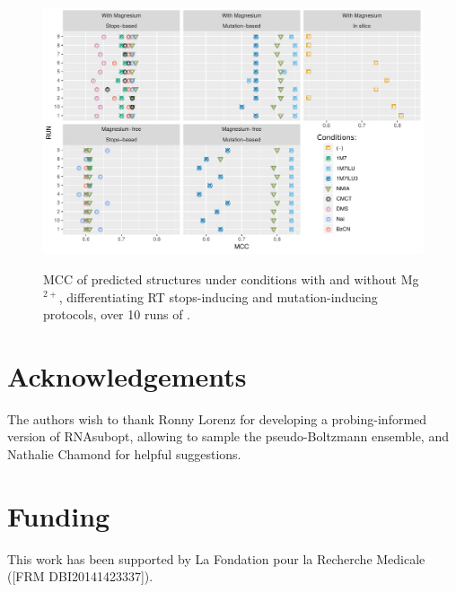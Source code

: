 \documentclass[a4,center,fleqn]{NAR}
\newcommand{\Software}[1]{\text{\ttfamily\bfseries #1}}
\newcommand{\OurTool}{\Software{IPANEMAP}\xspace}
\begin{document}
\begin{figure}
	{\centering\includegraphics[width=1\linewidth]{graphs/Reproductibility}\\}
	
	\caption{MCC of predicted structures under conditions with and without Mg$^{2+}$, differentiating RT stops-inducing and mutation-inducing protocols, over 10 runs of \OurTool{}. }\label{fig:reproducibility}
\end{figure}




%
%
%
%
%	
%	


\section*{Acknowledgements}
The authors wish to thank Ronny Lorenz for developing a probing-informed version of RNAsubopt, allowing to sample the pseudo-Boltzmann ensemble, and Nathalie Chamond for helpful suggestions.

\section*{Funding}
This work has been supported by La Fondation pour la Recherche Medicale ([FRM
DBI20141423337]).
%


\end{document}
